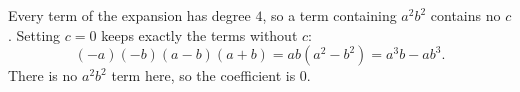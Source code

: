 Every term of the expansion has degree $4$, so a term containing $a^2b^2$ contains no $c$. Setting $c=0$ keeps exactly the terms without $c$:
\[(-a)(-b)(a-b)(a+b)=ab\left(a^2-b^2\right)=a^3b-ab^3 .\]
There is no $a^2b^2$ term here, so the coefficient is $\boxed{0}$.
